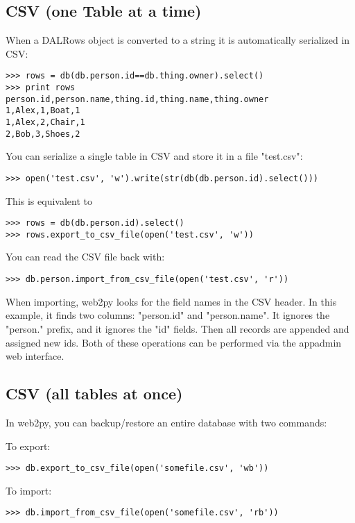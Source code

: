 \documentclass[justified,sixbynine,notoc]{tufte-book}
\def\inxx#1{\index{#1}}
\begin{document}
\begin{fullwidth}
\inxx{export} \inxx{import}

\goodbreak\subsection{CSV (one Table at a time)}

When a DALRows object is converted to a string it is automatically
serialized in CSV:

\inxx{csv}
\begin{lstlisting}
>>> rows = db(db.person.id==db.thing.owner).select()
>>> print rows
person.id,person.name,thing.id,thing.name,thing.owner
1,Alex,1,Boat,1
1,Alex,2,Chair,1
2,Bob,3,Shoes,2
\end{lstlisting}

You can serialize a single table in CSV and store it in a file "test.csv":
\begin{lstlisting}
>>> open('test.csv', 'w').write(str(db(db.person.id).select()))
\end{lstlisting}

This is equivalent to

\begin{lstlisting}
>>> rows = db(db.person.id).select()
>>> rows.export_to_csv_file(open('test.csv', 'w'))
\end{lstlisting}

You can read the CSV file back with:
\begin{lstlisting}
>>> db.person.import_from_csv_file(open('test.csv', 'r'))
\end{lstlisting}

When importing, web2py looks for the field names in the CSV header. In this example, it finds two columns: "person.id" and "person.name". It ignores the "person." prefix, and it ignores the "id" fields. Then all records are appended and assigned new ids. Both of these operations can be performed via the appadmin web interface.

\goodbreak\subsection{CSV (all tables at once)}

In web2py, you can backup/restore an entire database with two commands:

To export:
\begin{lstlisting}
>>> db.export_to_csv_file(open('somefile.csv', 'wb'))
\end{lstlisting}

To import:
\begin{lstlisting}
>>> db.import_from_csv_file(open('somefile.csv', 'rb'))
\end{lstlisting}


\end{fullwidth}
\end{document}
